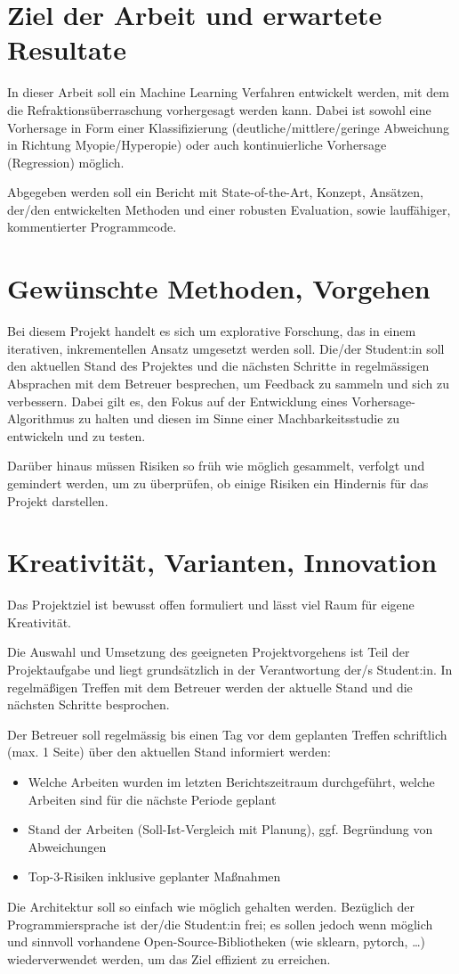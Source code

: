 \section{Ziel der Arbeit und erwartete Resultate}
In dieser Arbeit soll ein Machine Learning Verfahren entwickelt werden, mit dem die Refraktionsüberraschung vorhergesagt werden kann. Dabei ist sowohl eine Vorhersage in Form einer Klassifizierung (deutliche/mittlere/geringe Abweichung in Richtung Myopie/Hyperopie) oder auch kontinuierliche Vorhersage (Regression) möglich.

Abgegeben werden soll ein Bericht mit State-of-the-Art, Konzept, Ansätzen, der/den entwickelten Methoden und einer robusten Evaluation, sowie lauffähiger, kommentierter Programmcode.

\section{Gewünschte Methoden, Vorgehen}
Bei diesem Projekt handelt es sich um explorative Forschung, das in einem iterativen, inkrementellen Ansatz umgesetzt werden soll. Die/der Student:in soll den aktuellen Stand des Projektes und die nächsten Schritte in regelmässigen Absprachen mit dem Betreuer besprechen, um Feedback zu sammeln und sich zu verbessern. Dabei gilt es, den Fokus auf der Entwicklung eines Vorhersage-Algorithmus zu halten und diesen im Sinne einer Machbarkeitsstudie zu entwickeln und zu testen.

Darüber hinaus müssen Risiken so früh wie möglich gesammelt, verfolgt und gemindert werden, um zu überprüfen, ob einige Risiken ein Hindernis für das Projekt darstellen.

\section{Kreativität, Varianten, Innovation}
Das Projektziel ist bewusst offen formuliert und lässt viel Raum für eigene Kreativität.

Die Auswahl und Umsetzung des geeigneten Projektvorgehens ist Teil der Projektaufgabe und liegt grundsätzlich in der Verantwortung der/s Student:in. In regelmäßigen Treffen mit dem Betreuer werden der aktuelle Stand und die nächsten Schritte besprochen.

Der Betreuer soll regelmässig bis einen Tag vor dem geplanten Treffen schriftlich (max. 1 Seite) über den aktuellen Stand informiert werden:

\begin{itemize}
  \item Welche Arbeiten wurden im letzten Berichtszeitraum durchgeführt, welche Arbeiten sind für die nächste Periode geplant
  \item Stand der Arbeiten (Soll-Ist-Vergleich mit Planung), ggf. Begründung von Abweichungen
  \item Top-3-Risiken inklusive geplanter Maßnahmen
\end{itemize}

Die Architektur soll so einfach wie möglich gehalten werden. Bezüglich der Programmiersprache ist der/die Student:in frei; es sollen jedoch wenn möglich und sinnvoll vorhandene Open-Source-Bibliotheken (wie sklearn, pytorch, …) wiederverwendet werden, um das Ziel effizient zu erreichen.